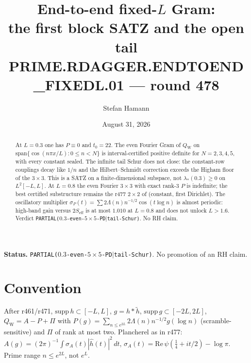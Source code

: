 \documentclass[11pt]{article}
\title{\bfseries End-to-end fixed-$L$ Gram:\\[2mm]
the first block SATZ and the open tail\\[2mm]
\large PRIME.RDAGGER.ENDTOEND\_FIXEDL.01 --- round 478}
\author{Stefan Hamann}
\date{August 31, 2026}
\theoremstyle{remark}
\newcommand{\QW}{Q_{\mathrm W}}
\begin{document}
\maketitle

\begin{abstract}\noindent
At $L=0.3$ one has $P\equiv0$ and $t_0=22$.
The even Fourier Gram of $\QW$ on
$\mathrm{span}\{\cos(n\pi x/L):0\le n<N\}$
is interval-certified positive definite for $N=2,3,4,5$,
with every constant sealed.
The infinite tail Schur does not close:
the constant-row couplings decay like $1/n$ and the
Hilbert--Schmidt correction exceeds the Higham floor of the $3\times3$.
This is a SATZ on a finite-dimensional subspace, not
$\lambda_*(0.3)\ge0$ on $L^2[-L,L]$.
At $L=0.8$ the even Fourier $3\times3$ with exact rank-$3$ $P$
is indefinite; the best certified substructure remains the
r477 $2\times2$ of (constant, first Dirichlet).
The oscillatory multiplier
$\sigma_P(t)=\sum 2\Lambda(n)n^{-1/2}\cos(t\log n)$
is almost periodic: high-band gain versus $2S_{\mathrm{eff}}$
is at most $1.010$ at $L=0.8$ and does not unlock $L>1.6$.
Verdict \texttt{PARTIAL($0.3$-even-$5\times5$-PD$|$tail-Schur)}.
No RH claim.
\end{abstract}

\medskip\noindent
\textbf{Status.}\enspace
\texttt{PARTIAL($0.3$-even-$5\times5$-PD$|$tail-Schur)}.
No promotion of an RH claim.

\begin{center}
\end{center}

\section{Convention}

After r461/r471, $\mathrm{supp}\,h\subset[-L,L]$,
$g=h*\widetilde h$, $\mathrm{supp}\,g\subset[-2L,2L]$,
$\QW=A-P+\Pi$ with
$P(g)=\sum_{n\le e^{2L}}2\Lambda(n)n^{-1/2}g(\log n)$
(scramble-sensitive) and $\Pi$ of rank at most two.
Plancherel as in r477:
$A(g)=(2\pi)^{-1}\int\sigma_A(t)|\hat h(t)|^2\,dt$,
$\sigma_A(t)=\mathrm{Re}\,\psi(\tfrac14+it/2)-\log\pi$.
Prime range $n\le e^{2L}$, not $e^L$.
\end{document}
